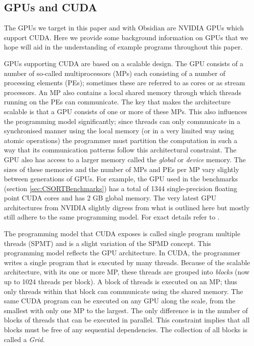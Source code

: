 \subsection{GPUs and CUDA} 

The GPUs we target in this paper and with Obsidian are NVIDIA GPUs which
support CUDA. Here we provide some background information on GPUs 
that we hope will aid in the understanding of example programs throughout this paper. 


GPUs supporting CUDA are based on a scalable design. The GPU consists of a 
number of so-called multiprocessors (MPs) each consisting of a number of 
processing elements (PEs); sometimes these are referred to as cores or as 
stream processors. An MP also contains a local shared memory through which 
threads running on the PEs can communicate. The key that 
makes the architecture scalable is that a GPU consists of one or more 
of these MPs. This also influences the programming model significantly; since
threads can only communicate in a synchronised manner using the local memory 
(or in a very limited way using atomic operations) the programmer must 
partition the computation in such a way that its communication patterns 
follow this architectural constraint. The GPU also has access to a larger 
memory called the {\em global} or {\em device} memory. The sizes of these 
memories and the number of MPs and PEs per MP vary slightly between 
generations of GPUs. For example, the GPU used in the benchmarks 
(section \ref{sec:CSORTBenchmarks}) has a total of 1344 single-precision floating
point CUDA cores and has 2 GB global memory. The very latest GPU architectures 
from NVIDIA slightly digress from what is outlined here but mostly still 
adhere to the same programming model. For exact details refer to .  

The programming model that CUDA exposes is called single program multiple 
threads (SPMT) and is a slight variation of the SPMD concept. This programming 
model reflects the GPU architecture. In CUDA, the programmer writes a single 
program that is executed by many threads. Because of the scalable architecture,
with its one or more MP, these threads are grouped into {\em blocks} 
(now up to 1024 threads per block). A block of threads is executed on an MP; 
thus only threads within that block can communicate using the shared memory. 
The same CUDA program can be executed on any GPU along the scale, from the 
smallest with only one MP to the largest. The only difference is in the number 
of blocks of threads that can be executed in parallel. This constraint implies 
that all blocks must be free of any sequential dependencies. The collection of 
all blocks is called a {\em Grid}.

